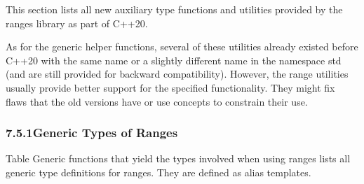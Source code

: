 
This section lists all new auxiliary type functions and utilities provided by the ranges library as part of C++20.

As for the generic helper functions, several of these utilities already existed before C++20 with the same name or a slightly different name in the namespace std (and are still provided for backward compatibility). However, the range utilities usually provide better support for the specified functionality. They might fix flaws that the old versions have or use concepts to constrain their use.

\subsubsection*{ 7.5.1\hspace{0.2cm}Generic Types of Ranges}

Table Generic functions that yield the types involved when using ranges lists all generic type definitions for ranges. They are defined as alias templates.

